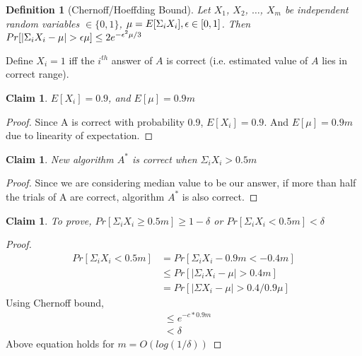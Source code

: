 \documentclass[11pt]{article}
\newtheorem{definition}[theorem]{Definition}
\newtheorem{claim}[theorem]{Claim}
\def\eps{\ensuremath\epsilon}
\begin{document}
\begin{definition}
[Chernoff/Hoeffding Bound]
Let $X_{1}$, $X_{2}$, $\ldots$, $X_{m}$ be independent random variables $\in \{0,1\}$,
$\mu = E[\Sigma_{i} X_{i}], \eps \in [0,1]$.
Then $Pr[|\Sigma_{i} X_{i}-\mu| > \eps\mu] \leq 2e^{-\eps^{2}\mu/3}$
\end{definition}

Define $X_{i} = 1$ iff the $i^{th}$ answer of $A$ is correct (i.e. estimated value of $A$ lies in correct range).

\begin{claim}
$E[X_{i}] = 0.9$, and $E[\mu] = 0.9m$
\end{claim}

\begin{proof}
Since A is correct with probability 0.9, $E[X_{i}] = 0.9$. And $E[\mu] = 0.9m$ due to linearity of expectation.
\end{proof}

\begin{claim}
New algorithm $A^{\ast}$ is correct when $\Sigma_{i} X_{i} > 0.5m$
\end{claim}

\begin{proof}
Since we are considering median value to be our answer, if more than half the trials of A are correct, algorithm $A^{\ast}$ is also correct.
\end{proof}

\begin{claim}
To prove, $Pr[\Sigma_{i} X_{i} \ge 0.5m] \ge 1-\delta$ or $Pr[\Sigma_{i} X_{i} < 0.5m] < \delta$
\end{claim}

\begin{proof}
\begin{equation}
\begin{split}
Pr[\Sigma_{i} X_{i} < 0.5m] & = Pr[\Sigma_{i} X_{i} - 0.9m < -0.4m]\\
& \le Pr[|\Sigma_{i} X_{i} - \mu| > 0.4m]\\
& = Pr[|\Sigma X_{i} - \mu| > 0.4/0.9 \mu]
\end{split}
\end{equation}
Using Chernoff bound,
\begin{equation}
\begin{split}
& \leq e^{-c*0.9m}\\
& < \delta
\end{split}
\end{equation}
Above equation holds for $m = O(log(1/\delta))$
\end{proof}
\end{document}
